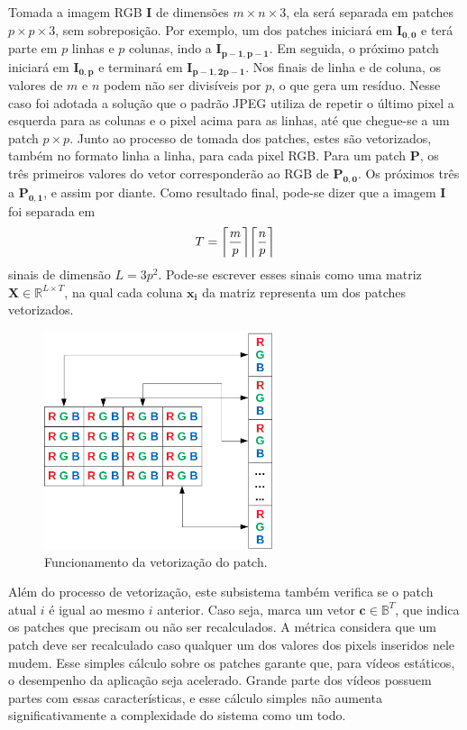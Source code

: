 \documentclass[cic,tc]{iiufrgs}
\renewcommand{\vec}[1]{\bm{#1}}
\newcommand{\mat}[1]{\bm{#1}}
\DeclarePairedDelimiter{\ceil}{\lceil}{\rceil}
\begin{document}
Tomada a imagem RGB $\mat{I}$ de dimensões $m \times n \times 3$, ela será separada em patches
$p \times p \times 3$, sem sobreposição. Por exemplo, um dos patches iniciará em $\mat{I_{0,0}}$
e terá parte em $p$ linhas e $p$ colunas, indo a $\mat{I_{p-1, p-1}}$. Em seguida, o próximo
patch iniciará em $\mat{I_{0, p}}$ e terminará em $\mat{I_{p-1, 2p-1}}$.
Nos finais de linha e de coluna, os valores de $m$ e $n$ podem não ser divisíveis por $p$,
o que gera um resíduo. Nesse caso foi adotada a solução que o padrão JPEG utiliza de repetir
o último pixel a esquerda para as colunas e o pixel acima para as linhas, até que chegue-se
a um patch $p \times p$.
Junto ao processo de tomada dos patches, estes são vetorizados, também no formato 
linha a linha, para cada pixel RGB.
Para um patch $\mat{P}$, os três primeiros valores do vetor corresponderão ao RGB de
$\mat{P_{0,0}}$. 
Os próximos três a $\mat{P_{0,1}}$, e assim por diante.
Como resultado final, pode-se dizer que a imagem $\mat{I}$ foi separada em 
\begin{equation*}
    T = \ceil*{\frac{m}{p}} \ceil*{\frac{n}{p}}
\end{equation*}
sinais de dimensão $L = 3p^2$. Pode-se escrever esses sinais como uma matriz 
$\mat{X}\in \mathbb{R}^{L\times T}$, 
na qual cada coluna $\vec{x_i}$ da matriz representa um dos patches vetorizados.
\begin{figure}[H]
    \caption{Funcionamento da vetorização do patch.}
    \begin{center}
        \includegraphics[width=0.6\textwidth]{img/vectorize}
    \end{center}
\end{figure}

Além do processo de vetorização, este subsistema também verifica se o patch atual $i$ é 
igual ao mesmo $i$ anterior. Caso seja, marca um vetor $\vec{c}\in \mathbb{B}^T$, que indica os 
patches que precisam ou não ser recalculados.
A métrica considera que um patch deve ser recalculado caso qualquer um dos valores dos 
pixels inseridos nele mudem.
Esse simples cálculo sobre os patches garante que, para vídeos estáticos, o desempenho
da aplicação seja acelerado.
Grande parte dos vídeos possuem partes com essas características, e esse cálculo simples
não aumenta significativamente a complexidade do sistema como um todo.
\end{document}
